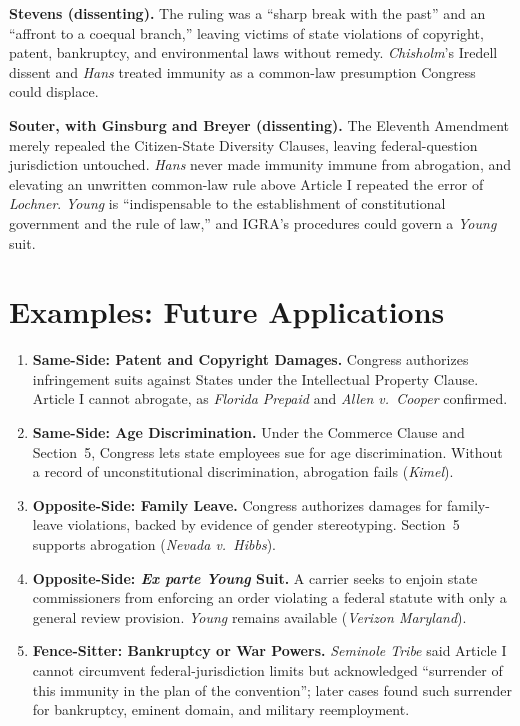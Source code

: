 \documentclass[12pt]{article}
\begin{document}
\textbf{Stevens (dissenting).} The ruling was a ``sharp break with the past'' and an ``affront to a coequal branch,'' leaving victims of state violations of copyright, patent, bankruptcy, and environmental laws without remedy. \textit{Chisholm}'s Iredell dissent and \textit{Hans} treated immunity as a common-law presumption Congress could displace.

\textbf{Souter, with Ginsburg and Breyer (dissenting).} The Eleventh Amendment merely repealed the Citizen-State Diversity Clauses, leaving federal-question jurisdiction untouched. \textit{Hans} never made immunity immune from abrogation, and elevating an unwritten common-law rule above Article I repeated the error of \textit{Lochner}. \textit{Young} is ``indispensable to the establishment of constitutional government and the rule of law,'' and IGRA's procedures could govern a \textit{Young} suit.

\section{Examples: Future Applications}

\begin{enumerate}
\item \textbf{Same-Side: Patent and Copyright Damages.} Congress authorizes infringement suits against States under the Intellectual Property Clause. Article I cannot abrogate, as \textit{Florida Prepaid} and \textit{Allen v.\ Cooper} confirmed.
\item \textbf{Same-Side: Age Discrimination.} Under the Commerce Clause and Section~5, Congress lets state employees sue for age discrimination. Without a record of unconstitutional discrimination, abrogation fails (\textit{Kimel}).
\item \textbf{Opposite-Side: Family Leave.} Congress authorizes damages for family-leave violations, backed by evidence of gender stereotyping. Section~5 supports abrogation (\textit{Nevada v.\ Hibbs}).
\item \textbf{Opposite-Side: \textit{Ex parte Young} Suit.} A carrier seeks to enjoin state commissioners from enforcing an order violating a federal statute with only a general review provision. \textit{Young} remains available (\textit{Verizon Maryland}).
\item \textbf{Fence-Sitter: Bankruptcy or War Powers.} \textit{Seminole Tribe} said Article I cannot circumvent federal-jurisdiction limits but acknowledged ``surrender of this immunity in the plan of the convention''; later cases found such surrender for bankruptcy, eminent domain, and military reemployment.
\end{enumerate}
\end{document}
